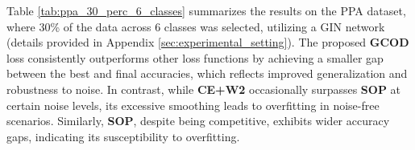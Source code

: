 
Table \ref{tab:ppa_30_perc_6_classes} summarizes the results on the PPA dataset, where 30\% of the data across $6$ classes was selected, utilizing a GIN network (details provided in Appendix \ref{sec:experimental_setting}). The proposed \textbf{GCOD} loss consistently outperforms other loss functions by achieving a smaller gap between the best and final accuracies, which reflects improved generalization and robustness to noise. In contrast, while \textbf{CE+W2} occasionally surpasses \textbf{SOP} \cite{liu2022robusttraininglabelnoise} at certain noise levels, its excessive smoothing leads to overfitting in noise-free scenarios. Similarly, \textbf{SOP}, despite being competitive, exhibits wider accuracy gaps, indicating its susceptibility to overfitting.




